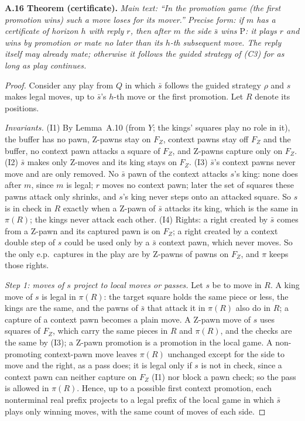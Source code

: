 \textbf{A.16 Theorem (certificate).} \emph{Main text: ``In the promotion game (the first promotion wins) such a move loses
for its mover.'' Precise form: if $m$ has a certificate of horizon $h$ with reply $r$, then after $m$ the side $\bar s$ wins
$\mathrm{P}$: it plays $r$ and wins by promotion or mate no later than its $h$-th
subsequent move. The reply itself may already mate; otherwise it follows
the guided strategy of (C3) for as long as play continues.}

\begin{proof}
Consider any play from $Q$ in which $\bar s$ follows the guided strategy $\rho$ and $s$ makes legal moves, up to $\bar s$'s
$h$-th move or the first promotion. Let $R$ denote its positions.

\emph{Invariants.} (I1) By Lemma~A.10 (from $Y$; the kings' squares play no role in it), the buffer has no pawn, Z-pawns
stay on $F_Z$, context pawns stay off $F_Z$ and the buffer, no context pawn attacks a square of $F_Z$, and Z-pawns capture
only on $F_Z$. (I2) $\bar s$ makes only Z-moves and its king stays on $F_Z$. (I3) $\bar s$'s context pawns never move and
are only removed. No $\bar s$ pawn of the context attacks $s$'s king: none does after $m$, since $m$ is legal; $r$ moves no
context pawn; later the set of squares these pawns attack only shrinks, and $s$'s king never steps onto an attacked square.
So $s$ is in check in $R$ exactly when a Z-pawn of $\bar s$ attacks its king, which is the same in $\pi(R)$; the kings
never attack each other. (I4) Rights: a right created by $\bar s$ comes from a Z-pawn and its captured pawn is on $F_Z$; a
right created by a context double step of $s$ could be used only by a $\bar s$ context pawn, which never moves. So the only
e.p.\ captures in the play are by Z-pawns of pawns on $F_Z$, and $\pi$ keeps those rights.

\emph{Step 1: moves of $s$ project to local moves or passes.} Let $s$ be to move in $R$. A king move of $s$ is legal in
$\pi(R)$: the target square holds the same piece or less, the kings are the same, and the pawns of $\bar s$ that attack it
in $\pi(R)$ also do in $R$; a capture of a context pawn becomes a plain move. A Z-pawn move of $s$ uses squares of $F_Z$,
which carry the same pieces in $R$ and $\pi(R)$, and the checks are the same by (I3); a Z-pawn promotion is a promotion in
the local game. A non-promoting context-pawn move leaves $\pi(R)$ unchanged except for the side to move and the right, as a pass does; it
is legal only if $s$ is not in check, since a context pawn can neither capture on $F_Z$ (I1) nor block a pawn check; so the
pass is allowed in $\pi(R)$. Hence, up to a possible first context promotion, each nonterminal real prefix projects to a legal prefix of the local game in which $\bar s$ plays only
winning moves, with the same count of moves of each side.


\end{proof}
